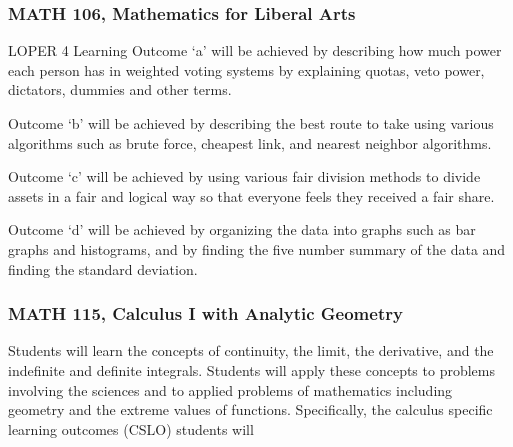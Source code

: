 \documentclass[11pt]{article}
\begin{document}
\subsubsection{MATH 106, Mathematics for Liberal Arts} 
LOPER 4 Learning Outcome `a' will be achieved by describing how 
much power each person has in weighted voting systems by explaining 
quotas, veto power, dictators, dummies and other terms. 

Outcome `b' will be achieved by describing the best route to take 
using various algorithms such as brute force, cheapest link, and 
nearest neighbor algorithms. 

Outcome `c' will be achieved by using various fair division methods 
to divide assets in a fair and logical way so that everyone feels 
they received a fair share. 

Outcome `d' will be achieved by organizing the data into graphs such 
as bar graphs and histograms, and by finding the five number summary 
of the data and finding the standard deviation. 


\subsubsection{MATH 115, Calculus I with Analytic Geometry} 

Students will learn the concepts of continuity, 
the limit, the derivative, and the indefinite and definite integrals. 
Students will apply these concepts to problems involving the sciences 
and to applied problems of mathematics including geometry and the 
extreme values of functions. Specifically, the calculus specific learning outcomes 
(CSLO) students will
\end{document}
